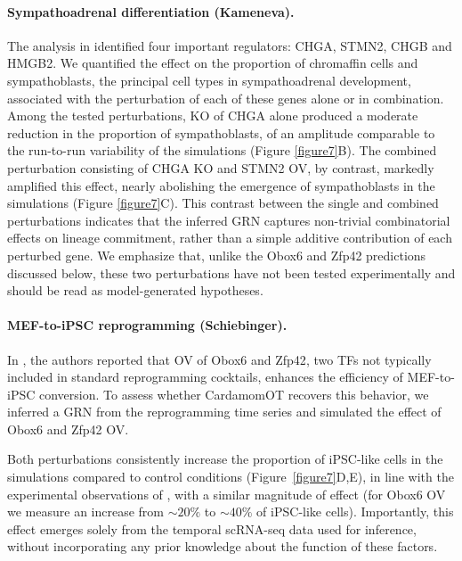 \documentclass[a4paper, 11pt]{article}
\theoremstyle{plain}
\theoremstyle{remark}
\newcommand*{\firstreview}[1]{{\color{black}#1}}
\begin{document}
\paragraph{Sympathoadrenal differentiation (Kameneva).}  
The analysis in \cite{gandrillon2025inferring} identified four important regulators: {CHGA}, {STMN2}, {CHGB} and {HMGB2}. We quantified the effect on the proportion of chromaffin cells and sympathoblasts, the principal cell types in sympathoadrenal development, associated with the perturbation of each of these genes alone or in combination. Among the tested perturbations, KO of CHGA alone produced a moderate reduction in the proportion of sympathoblasts, of an amplitude comparable to the run-to-run variability of the simulations (Figure \ref{figure7}B). The combined perturbation consisting of CHGA KO and STMN2 OV, by contrast, markedly amplified this effect, nearly abolishing the emergence of sympathoblasts in the simulations (Figure \ref{figure7}C). This contrast between the single and combined perturbations indicates that the inferred GRN captures non-trivial combinatorial effects on lineage commitment, rather than a simple additive contribution of each perturbed gene. We emphasize that, unlike the Obox6 and Zfp42 predictions discussed below, these two perturbations have not been tested experimentally and should be read as model-generated hypotheses.

\paragraph{MEF-to-iPSC reprogramming (Schiebinger).}  
In \cite{schiebinger2019optimal}, the authors reported that OV of {Obox6} and {Zfp42}, 
two \firstreview{TFs} not typically included in standard reprogramming cocktails, 
enhances the efficiency of MEF-to-iPSC conversion. To assess whether CardamomOT 
recovers this behavior, we inferred a GRN from the reprogramming time series and 
simulated the effect of {Obox6} and {Zfp42} OV.

Both perturbations consistently increase the proportion of iPSC-like cells \firstreview{in the simulations} compared 
to control conditions (Figure~\ref{figure7}D,E), in line with the experimental 
observations of \cite{schiebinger2019optimal}, with a similar magnitude of 
effect (for {Obox6} OV we measure an increase from $\sim 20\%$ to $\sim 40\%$ of iPSC-like cells). Importantly, this effect emerges solely from the temporal scRNA-seq data 
used for inference, without incorporating any prior knowledge about the function 
of these factors.
\end{document}
